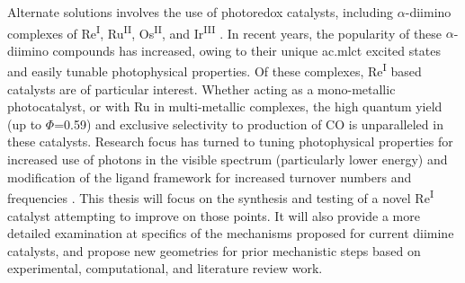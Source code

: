 Alternate solutions involves the use of photoredox catalysts, including $\alpha$-diimino complexes of Re\textsuperscript{I}, Ru\textsuperscript{II}, Os\textsuperscript{II}, and Ir\textsuperscript{III}  \autocite{hawecker1983, schneider2011, ishida1987, maidan1986, ishida1990, kitamura1983, tanaka2002, doherty2009, doherty2010, tamaki2013, shunsuke2013, reithmeier2014}. In recent years, the popularity of these $\alpha$-diimino compounds has increased, owing to their unique \gls{ac.mlct} excited states and easily tunable photophysical properties. Of these complexes, Re\textsuperscript{I} based catalysts are of particular interest. Whether acting as a mono-metallic photocatalyst, or with Ru in multi-metallic complexes, the high quantum yield (up to $\Phi$=0.59)\autocite{hori1996, takeda2008} and exclusive selectivity to production of CO is unparalleled in these catalysts\autocite{grills2010, windle2012}. Research focus has turned to tuning photophysical properties for increased use of photons in the visible spectrum (particularly lower energy) and modification of the ligand framework for increased turnover numbers and frequencies \autocite{grills2010, morris2009, shavaleev2004, kutal1985, larsen2014}. This thesis will focus on the synthesis and testing of a novel Re\textsuperscript{I} catalyst attempting to improve on those points. It will also provide a more detailed examination at specifics of the mechanisms proposed for current  diimine catalysts, and propose new geometries for prior mechanistic steps based on experimental, computational, and literature review work.
